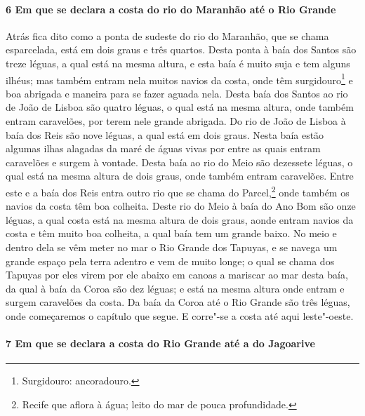 \paragraph{6 Em que se declara a costa do rio do Maranhão até o Rio Grande}

Atrás fica dito como a ponta de sudeste do rio do Maranhão, que se chama esparcelada, está
em dois graus e três quartos. Desta ponta à baía dos Santos são treze léguas, a qual está
na mesma altura, e esta baía é muito suja e tem alguns ilhéus; mas também entram nela
muitos navios da costa, onde têm surgidouro\footnote{Surgidouro: ancoradouro.} e boa abrigada e maneira para se fazer aguada
nela. Desta baía dos Santos ao rio de João de Lisboa são quatro léguas, o qual está na
mesma altura, onde também entram caravelões, por terem nele grande abrigada. Do rio de
João de Lisboa à baía dos Reis são nove léguas, a qual está em dois graus. Nesta baía
estão algumas ilhas alagadas da maré de águas vivas por entre as quais entram caravelões e
surgem à vontade. Desta baía ao rio do Meio são dezessete léguas, o qual está na mesma
altura de dois graus, onde também entram caravelões. Entre este e a baía dos Reis entra
outro rio que se chama do Parcel,\footnote{ Recife que aflora à água; leito do mar de pouca
profundidade.} onde também os navios da costa têm boa colheita. Deste rio do Meio à baía
do Ano Bom são onze léguas, a qual costa está na mesma altura de dois graus, aonde entram
navios da costa e têm muito boa colheita, a qual baía tem um grande baixo. No meio e
dentro dela se vêm meter no mar o Rio Grande dos Tapuyas, e se navega um grande espaço
pela terra adentro e vem de muito longe; o qual se chama dos Tapuyas por eles virem por
ele abaixo em canoas a mariscar ao mar desta baía, da qual à baía da Coroa são dez léguas;
e está na mesma altura onde entram e surgem caravelões da costa. Da baía da Coroa até o
Rio Grande são três léguas, onde começaremos o capítulo que segue. E corre"-se a costa até
aqui leste"-oeste.

\paragraph{7 Em que se declara a costa do Rio Grande até a do Jagoarive}

